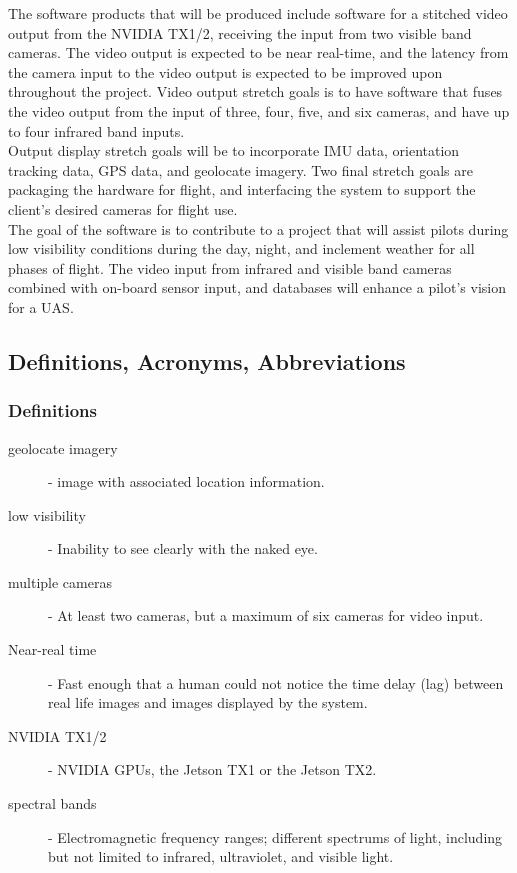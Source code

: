 \documentclass[letterpaper,10pt,serif,draftclsnofoot,onecolumn,compsoc,titlepage]{IEEEtran}
\begin{document}
The software products that will be produced include software for a stitched video output 
from the NVIDIA TX1/2, receiving the input from two visible band cameras. 
The video output is expected to be near real-time, and the latency from the camera 
input to the video output is expected to be improved upon throughout the project. Video 
output stretch goals is to have software that fuses the video output from the input of 
three, four, five, and six cameras, and have up to four infrared band inputs.\\

Output display stretch goals will be to incorporate IMU data, orientation tracking 
data, GPS data, and geolocate imagery. Two final stretch goals are packaging the 
hardware for flight, and interfacing the system to support the client's desired 
cameras for flight use.\\

The goal of the software is to contribute to a project that will assist pilots during 
low visibility conditions during the day, night, and inclement weather for all phases 
of flight. The video input from infrared and visible band cameras combined with 
on-board sensor input, and databases will enhance a pilot's vision for a UAS.\\

\subsection{Definitions, Acronyms, Abbreviations}

\subsubsection{Definitions}

\begin{description}
	\item[geolocate imagery] - image with associated location information.
	\item[low visibility] - Inability to see clearly with the naked eye.
	\item[multiple cameras] - At least two cameras, but a maximum of six cameras for 
	video input.
	\item[Near-real time] - Fast enough that a human could not notice the time delay (lag) between real life images and images displayed by the system.
	\item[NVIDIA TX1/2] - NVIDIA GPUs, the Jetson TX1 or the Jetson TX2.
	\item[spectral bands] - Electromagnetic frequency ranges; different spectrums of light, including but not limited to infrared, ultraviolet, and visible light.
\end{description}
\end{document}
